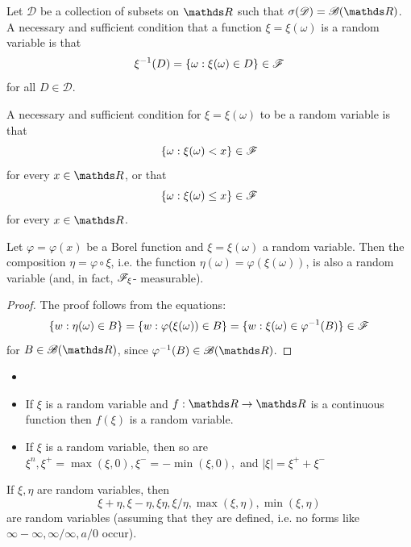 \begin{lemma}
Let $\mathcal{D}$ be a collection of subsets on $\R$ such that $\sigma(\mathcal{D}) = \B(\R)$. A necessary and sufficient condition that a function $\xi = \xi(\omega)$ is a random variable is that
\begin{equation*}
    \xi^{-1}(D) = \{ \omega: \xi(\omega) \in D \} \in \mathcal{F}
\end{equation*}
for all $D \in \mathcal{D}$.
\end{lemma}
\begin{corollary}
A necessary and sufficient condition for $\xi = \xi(\omega)$ to be a random variable is that
\begin{equation*}
    \{ \omega: \xi(\omega) < x \} \in \mathcal{F}
\end{equation*}
for every $x \in \R$, or that
\begin{equation*}
    \{ \omega: \xi(\omega) \le x \} \in \mathcal{F}
\end{equation*}
for every $x \in \R$.
\end{corollary}
\begin{lemma}
Let $\varphi = \varphi(x)$ be a Borel function and $\xi = \xi(\omega)$ a random variable. Then the composition $\eta = \varphi \circ \xi$, i.e. the function $\eta(\omega) = \varphi(\xi(\omega))$, is also a random variable (and, in fact, $\mathcal{F}_\xi$- measurable).
\end{lemma}
\begin{proof}
The proof follows from the equations:
\begin{equation*}
    \{w:\eta(\omega) \in B \} = \{w:\varphi(\xi(\omega)) \in B \} = \{w:\xi(\omega) \in \varphi^{-1}(B)  \} \in \mathcal{F}
\end{equation*}
for $B \in \B(\R)$, since $\varphi^{-1}(B) \in \B(\R)$.
\end{proof}

\begin{example}
\begin{itemize}
    \item[]
    \item If $\xi$ is a random variable and $f: \R \rightarrow \R$ is a continuous function then $f(\xi)$ is a random variable.
    \item If $\xi$ is a random variable, then so are $\xi^n, \xi^+ = \max(\xi,0), \xi^-=-\min(\xi,0),$ and $|\xi| = \xi^+ + \xi^-$
\end{itemize}
\end{example}

\begin{lemma}
If $\xi,\eta$ are random variables, then 
\begin{equation*}
    \xi + \eta, \xi - \eta, \xi \eta, \xi/ \eta, \max{(\xi,\eta)}, \min{(\xi,\eta)}
\end{equation*}
are random variables (assuming that they are defined, i.e. no forms like $\infty - \infty, \infty/\infty,  a/0$ occur).
\end{lemma}

